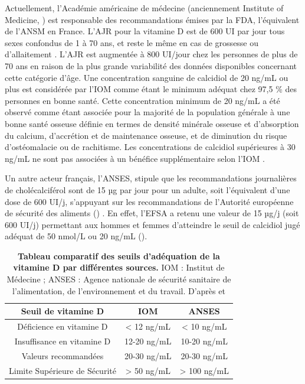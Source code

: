 \documentclass[
  a4paper,
  DIV=11,
  numbers=noendperiod,
  listof=totoc]{scrreprt}
\begin{document}
Actuellement, l'Académie américaine de médecine (anciennement Institute
of Medicine, ) est responsable des recommandations émises par
la \ac{FDA}, l'équivalent de l'\ac{ANSM} en France. L'\ac{AJR} pour la
vitamine D est de 600 UI par jour tous sexes confondus de 1 à 70 ans, et
reste le même en cas de grossesse ou d'allaitement \autocite{IOM.2011}.
L'\ac{AJR} est augmentée à 800 UI/jour chez les personnes de plus de 70
ans en raison de la plus grande variabilité des données disponibles
concernant cette catégorie d'âge. Une concentration sanguine de
calcidiol de 20 ng/mL ou plus est considérée par l'\ac{IOM} comme étant
le minimum adéquat chez 97,5 \% des personnes en bonne santé. Cette
concentration minimum de 20 ng/mL a été observé comme étant associée
pour la majorité de la population générale à une bonne santé osseuse
définie en termes de densité minérale osseuse et d'absorption du
calcium, d'accrétion et de maintenance osseuse, et de diminution du
risque d'ostéomalacie ou de rachitisme. Les concentrations de calcidiol
supérieures à 30 ng/mL ne sont pas associées à un bénéfice
supplémentaire selon l'\ac{IOM} \autocite{IOM.2011,Rosen.IOM.2012}.

Un autre acteur français, l'\ac{ANSES}, stipule que les recommandations
journalières de cholécalciférol sont de 15 µg par jour pour un adulte,
soit l'équivalent d'une dose de 600 UI/j, s'appuyant sur les
recommandations de l'Autorité européenne de sécurité des aliments
() \autocite{ANSES.2021}. En effet, l'\ac{EFSA} a retenu une
valeur de 15 µg/j (soit 600 UI/j) permettant aux hommes et femmes
d'atteindre le seuil de calcidiol jugé adéquat de 50 nmol/L ou 20 ng/mL
\autocite{ANSES.2022.note} ().

\begin{table}
\caption[Tableau comparatif des seuils d'adéquation de la vitamine D par différentes sources.]{\textbf{Tableau comparatif des seuils d'adéquation de la vitamine D par différentes sources.} IOM : Institut de Médecine ; ANSES : Agence nationale de sécurité sanitaire de l’alimentation, de l’environnement et du travail. D'après \textcite{IOM.2011} et \textcite{ANSES.2021}}
\label{tbl-seuil}
\centering
\begin{tabular}{ccc}
\toprule
\textbf{Seuil de vitamine D} & \textbf{IOM} & \textbf{ANSES}\\
\midrule
Déficience en vitamine D & < 12 ng/mL & < 10 ng/mL\\
Insuffisance en vitamine D & 12-20 ng/mL & 10-20 ng/mL\\
Valeurs recommandées & 20-30 ng/mL & 20-30 ng/mL\\
Limite Supérieure de Sécurité & > 50 ng/mL  & > 100 ng/mL \\
\bottomrule
\end{tabular}
\end{table}
\end{document}
